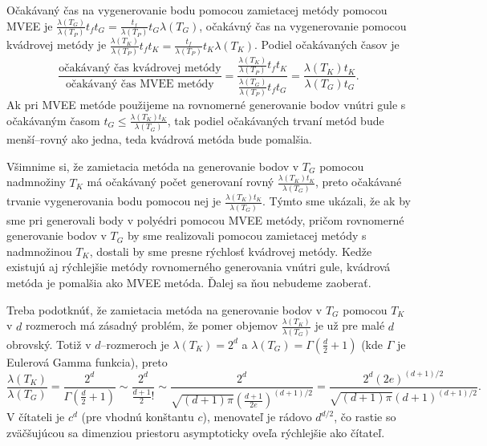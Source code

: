 Očakávaný čas na vygenerovanie bodu pomocou zamietacej metódy pomocou MVEE je $\frac{\lambda(T_G)}{\lambda(T_P)}t_ft_G=\frac{t_f}{\lambda(T_P)}t_G\lambda(T_G)$, očakávný čas na vygenerovanie pomocou kvádrovej metódy je $\frac{\lambda(T_K)}{\lambda(T_P)}t_ft_K=\frac{t_f}{\lambda(T_P)}t_K\lambda(T_K)$.
Podiel očakávaných časov je $$\frac{\text{očakávaný čas kvádrovej metódy}}{\text{očakávaný čas MVEE metódy}}=\frac{\frac{\lambda(T_K)}{\lambda(T_P)}t_ft_K}{\frac{\lambda(T_G)}{\lambda(T_P)}t_ft_G}=\frac{\lambda(T_K)t_K}{\lambda(T_G)t_G}.$$ Ak pri MVEE metóde použijeme na rovnomerné generovanie bodov vnútri gule s očakávaným časom $t_G \le \frac{\lambda(T_K)t_K}{\lambda(T_G)}$, tak podiel očakávaných trvaní metód bude menší--rovný ako jedna, teda kvádrová metóda bude pomalšia.

Všimnime si, že zamietacia metóda na generovanie bodov v $T_G$ pomocou nadmnožiny $T_K$ má očakávaný počet generovaní rovný $\frac{\lambda(T_K)t_K}{\lambda(T_G)}$, preto očakávané trvanie vygenerovania bodu pomocou nej je $\frac{\lambda(T_K)t_K}{\lambda(T_G)}$.
Týmto sme ukázali, že ak by sme pri generovali body v polyédri pomocou MVEE metódy, pričom rovnomerné generovanie bodov v $T_G$ by sme realizovali pomocou zamietacej metódy s nadmnožinou $T_K$, dostali by sme presne rýchlosť kvádrovej metódy. Kedže existujú aj rýchlejšie metódy rovnomerného generovania vnútri gule, kvádrová metóda je pomalšia ako MVEE metóda. Ďalej sa ňou nebudeme zaoberať.

Treba podotknúť, že zamietacia metóda na generovanie bodov v $T_G$ pomocou $T_K$ v $d$ rozmeroch má zásadný problém, že pomer objemov $\frac{\lambda(T_K)}{\lambda(T_G)}$ je už pre malé $d$ obrovský. Totiž v $d$--rozmeroch je $\lambda(T_K)=2^d$ a $\lambda(T_G)=\Gamma(\frac d 2 + 1)$ (kde $\Gamma$ je Eulerová Gamma funkcia), preto 
$$\frac{\lambda(T_K)}{\lambda(T_G)}=\frac{2^d}{\Gamma(\frac d 2 + 1)} \sim \frac{2^d}{\frac{d+1}{2}!}\sim \frac{2^{d}}{\sqrt{(d+1)\pi}(\frac{d+1}{2e})^{(d+1)/2}}=\frac{2^d (2e)^{(d+1)/2}}{\sqrt{(d+1)\pi}(d+1)^{(d+1)/2}}.$$
V čítateli je $c^d$ (pre vhodnú konštantu $c$), menovateľ je rádovo $d^{d/2}$, čo rastie so zväčšujúcou sa dimenziou priestoru asymptoticky oveľa rýchlejšie ako čítateľ.
